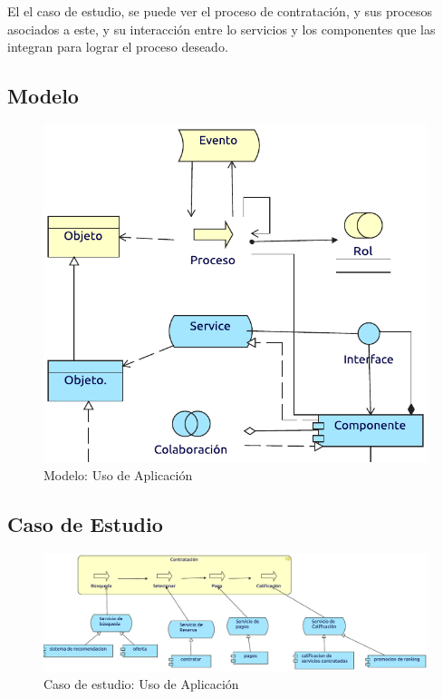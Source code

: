 El el caso de estudio, se puede ver el proceso de contratación, y sus procesos asociados a este, y su interacción entre lo servicios y los componentes que las integran para lograr el proceso deseado.
\subsection{Modelo}
\begin{figure}[h!]
	\centering
	\includegraphics[width=0.9\linewidth]{Arquitectura/Aplicacion/imgs/uso.pdf}
	\caption{Modelo: Uso de Aplicación}
\end{figure}
\newpage
\subsection{Caso de Estudio}

\begin{figure}[h!]
	\centering
	\includegraphics[width=\linewidth]{Arquitectura/Aplicacion/imgs/usoMetamodelo.pdf}
	\caption{Caso de estudio: Uso de Aplicación}
\end{figure}